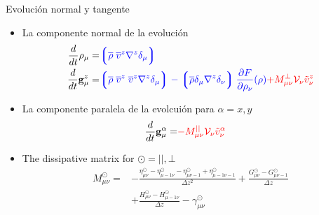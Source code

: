 \documentclass{beamer}
\newcommand{\llg}{\left\lgroup}
\newcommand{\rlg}{\right\rgroup}
\begin{document}
\begin{frame}{Evolución normal y tangente}
\begin{itemize}
  \item La componente normal de la evolución
\begin{align}
  \frac{d}{dt}\rho_\mu=&  {\color{blue} \llg\overline{\rho} \; \overline{v}^{z}{\nabla}^{z}\delta_\mu \rlg}
\nonumber\\
    \frac{d}{dt}{{\bf g}}^{z}_\mu=&
{\color{blue} \llg\overline{\rho}\; \overline{v}^{z}\;\overline{v}^{z}{\nabla}^{z}\delta_{\mu}\rlg
-\llg\overline{\rho}\delta_{\mu}{\nabla}^{z}\delta_{\nu}\rlg
\frac{\partial  F}{\partial \rho_{\nu}}(\rho)}
{\color{red} +M_{\mu\nu}^{\bot}{\cal V}_\nu\tilde{v}^{z}_\nu}
\nonumber
\end{align}
  \item La componente paralela de la evolcuión para  $\alpha=x,y$  
\begin{align}
  \frac{d}{dt}{{\bf g}}^\alpha_\mu=&{\color{red}-M_{\mu\nu}^{||}{\cal V}_\nu\tilde{v}^\alpha_\nu}
\nonumber
\end{align}
\item The dissipative matrix for $\odot=||,\bot$
\begin{align}
M^{\odot}_{\mu\nu} 
=&-\frac{\eta^{\odot}_{\mu\nu}-\eta^{\odot}_{\mu-1\nu}-\eta^{\odot}_{\mu\nu-1}+\eta^{\odot}_{\mu-1\nu-1}}{\Delta z^2}
+\frac{{G}^{\odot}_{\mu\nu}-{G}^{\odot}_{\mu\nu-1}}{\Delta z} \nonumber \\
&+\frac{{H}^{\odot}_{\mu\nu}-{H}^{\odot}_{\mu-1\nu}}{\Delta z}
-{\gamma}^{\odot}_{\mu\nu}
\nonumber
\end{align}
\end{itemize}
\end{frame}
\end{document}
